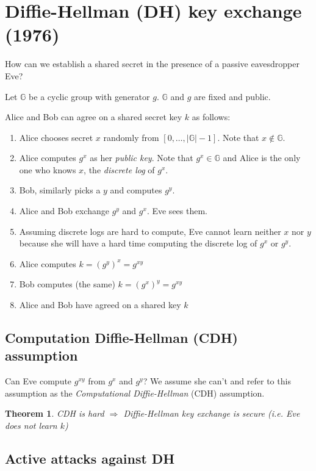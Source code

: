 \documentclass[12pt]{article}
\newtheorem{thm}{Theorem}[section]
\newcommand{\G}{\mathbb{G}}
\begin{document}
\section{Diffie-Hellman (DH) key exchange (1976)}

How can we establish a shared secret in the presence of a passive eavesdropper
Eve?

Let $\G$ be a cyclic group with generator $g$. $\G$ and $g$ are fixed and public.

Alice and Bob can agree on a shared secret key $k$ as follows:

\begin{enumerate}
  \item Alice chooses secret $x$ randomly from $[0, \dots, |\G|-1]$. Note that
  $x \notin \G$.
  \item Alice computes $ g^x$ as her \emph{public key}. Note that $g^x \in \G$
  and Alice is the only one who knows $x$, the \emph{discrete log} of $g^x$.
  \item Bob, similarly picks a $y$ and computes $g^y$.
  \item Alice and Bob exchange $g^y$ and $g^x$. Eve sees them.
  \item Assuming discrete logs are hard to compute, Eve cannot learn neither $x$
  nor $y$ because she will have a hard time computing the discrete log of $g^x$ or
  $g^y$.
  \item Alice computes $k = (g^y)^x = g^{xy}$
  \item Bob computes (the same) $k = (g^x)^y = g^{xy}$
  \item Alice and Bob have agreed on a shared key $k$
\end{enumerate}

\subsection{Computation Diffie-Hellman (CDH) assumption}
Can Eve compute $g^{xy}$ from $g^x$ and $g^y$? We assume she can't and
refer to this assumption as the \emph{Computational Diffie-Hellman} (CDH)
assumption.

\begin{thm}
CDH is hard $\Rightarrow$ Diffie-Hellman key exchange is secure (i.e.
Eve does not learn $k$)
\end{thm}

\subsection{Active attacks against DH}
\end{document}
